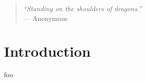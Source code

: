 
\begin{quote}
	\textit{``Standing on the shoulders of dragons.''} \\ --- Anonymous
\end{quote}

\section{Introduction}
\label{sec:introduction}

foo




